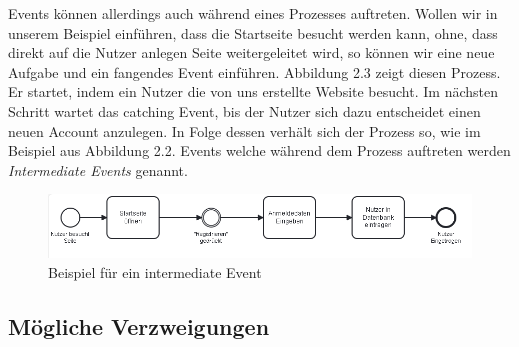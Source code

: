 Events können allerdings auch während eines Prozesses auftreten. Wollen wir in unserem Beispiel einführen, dass die Startseite besucht werden kann, ohne, dass direkt auf die Nutzer anlegen Seite weitergeleitet wird, so können wir eine neue Aufgabe und ein fangendes Event einführen. Abbildung 2.3 zeigt diesen Prozess. Er startet, indem ein Nutzer die von uns erstellte Website besucht. Im nächsten Schritt wartet das catching Event, bis der Nutzer sich dazu entscheidet einen neuen Account anzulegen. In Folge dessen verhält sich der Prozess so, wie im Beispiel aus Abbildung 2.2. Events welche während dem Prozess auftreten werden \emph{Intermediate Events} genannt.

\begin{figure}
\centering
\includegraphics[scale=0.6]{Figures/Beispiel3}
\decoRule
\caption[Intermediate Events]{Beispiel für ein intermediate Event}
\label{fig:Task}
\end{figure}

\subsection{Mögliche Verzweigungen}
 
